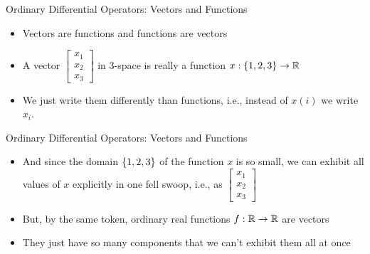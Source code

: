 
\begin{frame}
Ordinary Differential Operators: Vectors and Functions

\begin{itemize}
  \item Vectors are functions and functions are vectors
  
\item A vector $\begin{bmatrix}x_1\\x_2\\x_3\end{bmatrix}$ in 3-space is really a 
function $x:\left\{1,2,3\right\}\rightarrow \mathbb{R}$
  
\item We just write them differently than functions, i.e., instead of $x(i)$ 
we write $x_i$. 

\end{itemize} 

\end{frame}


\begin{frame}
Ordinary Differential Operators: Vectors and Functions
 
\begin{itemize}
  
\item And since the domain $\left\{1,2,3\right\}$ of the function $x$ is so small, we can 
exhibit all values of $x$ explicitly in one fell swoop, i.e., 
as $\begin{bmatrix}x_1\\x_2\\x_3\end{bmatrix}$
  
\item But, by the same token, ordinary real functions $f:\mathbb{R}\rightarrow\mathbb{R}$ are 
vectors
  
\item They just have so many components that we can't exhibit them all at once

\end{itemize} 

\end{frame}


